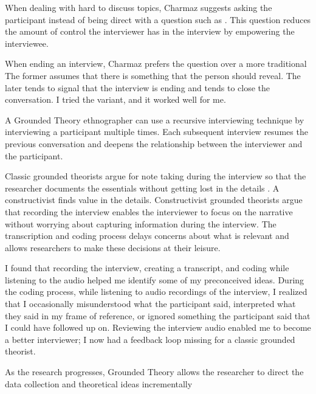 When dealing with hard to discuss topics, Charmaz suggests asking the participant  instead of being direct with a question such as  \cite{Charmaz}. This question reduces the amount of control the interviewer has in the interview by empowering the interviewee.

When ending an interview, Charmaz prefers the question  over a more traditional  The former assumes that there is something that the person should reveal. The later tends to signal that the interview is ending and tends to close the conversation. I tried the variant,  and it worked well for me.

A Grounded Theory ethnographer can use a recursive interviewing technique by interviewing a participant multiple times. Each subsequent interview resumes the previous conversation and deepens the relationship between the interviewer and the participant. 

Classic grounded theorists argue for note taking during the interview
so that the researcher documents the essentials without getting lost in the details \cite{GlaserTheoreticalSensitivity, GlaserGroundedTheoryPerspective}.  A constructivist finds value in the details. Constructivist grounded theorists argue that recording the interview enables the interviewer to focus on the narrative without worrying about capturing information during the interview. The transcription and coding process delays concerns about what is relevant and allows researchers to make these decisions at their leisure.  

I found that recording the interview, creating a transcript, and coding while listening to the audio helped me identify some of my preconceived ideas. During the coding process, while listening to audio recordings of the interview, I realized that I occasionally misunderstood what the participant said, interpreted what they said in my frame of reference,  or ignored something the participant said that I could have followed up on. Reviewing the interview audio enabled me to become a better interviewer; I now had a feedback loop missing for a classic grounded theorist.

As the research progresses, Grounded Theory allows the researcher to direct the data collection and theoretical ideas incrementally

